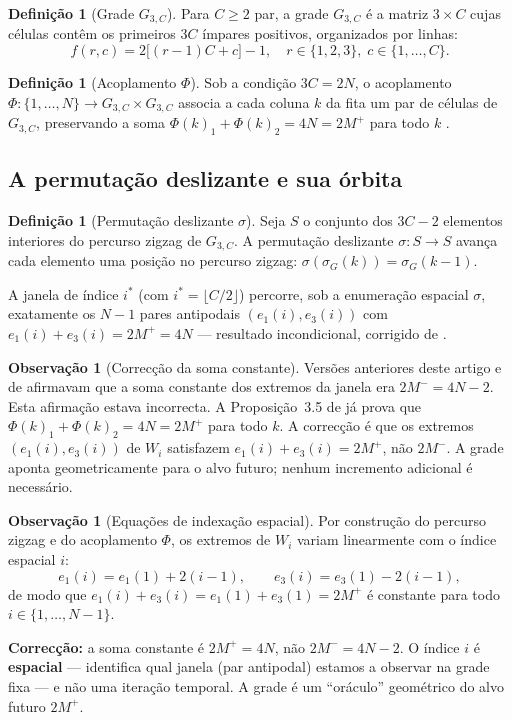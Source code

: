 \documentclass[12pt,a4paper]{article}
\theoremstyle{definition}
\newtheorem{definition}[theorem]{Definição}
\newtheorem{remark}[theorem]{Observação}
\begin{document}
	\begin{definition}[Grade $G_{3,C}$]
		Para $C \geq 2$ par, a grade $G_{3,C}$ é a matriz $3 \times C$ cujas
		células contêm os primeiros $3C$ ímpares positivos, organizados por linhas:
		\[
		f(r,c) = 2\bigl[(r-1)C + c\bigr] - 1,\quad r \in \{1,2,3\},\; c \in \{1,\ldots,C\}.
		\]
	\end{definition}
	
	\begin{definition}[Acoplamento $\Phi$]
		Sob a condição $3C = 2N$, o acoplamento $\Phi: \{1,\ldots,N\} \to
		G_{3,C}\times G_{3,C}$ associa a cada coluna $k$ da fita um par de células
		de $G_{3,C}$, preservando a soma $\Phi(k)_1 + \Phi(k)_2 = 4N = 2M^+$
		para todo $k$ \cite[Prop.~3.5]{motor}.
	\end{definition}
	
	\subsection{A permutação deslizante e sua órbita}
	
	\begin{definition}[Permutação deslizante $\sigma$]
		Seja $S$ o conjunto dos $3C-2$ elementos interiores do percurso zigzag
		de $G_{3,C}$. A permutação deslizante $\sigma: S \to S$ avança cada
		elemento uma posição no percurso zigzag: $\sigma(\sigma_G(k)) =
		\sigma_G(k-1)$.
	\end{definition}
	
	A janela de índice $i^*$ (com $i^* = \lfloor C/2 \rfloor$) percorre,
	sob a enumeração espacial $\sigma$, exatamente os $N-1$ pares antipodais
	$(e_1(i), e_3(i))$ com $e_1(i) + e_3(i) = 2M^+ = 4N$ — resultado
	incondicional, corrigido de \cite[Prop.~4.3, Prop.~4.6]{motor}.
	
	\begin{remark}[Correcção da soma constante]
		\label{rem:correcao-soma}
		Versões anteriores deste artigo e de \cite{motor} afirmavam que a
		soma constante dos extremos da janela era $2M^- = 4N-2$.  Esta
		afirmação estava incorrecta.  A Proposição~3.5 de \cite{motor} já
		prova que $\Phi(k)_1 + \Phi(k)_2 = 4N = 2M^+$ para todo $k$.
		A correcção é que os extremos $(e_1(i), e_3(i))$ de $W_i$
		satisfazem $e_1(i)+e_3(i) = 2M^+$, não $2M^-$.  A grade aponta
		geometricamente para o alvo futuro; nenhum incremento adicional
		é necessário.
	\end{remark}
	
	\begin{remark}[Equações de indexação espacial]
		\label{rem:movimento}
		Por construção do percurso zigzag e do acoplamento $\Phi$, os
		extremos de $W_i$ variam linearmente com o índice espacial $i$:
		\[
		e_1(i) = e_1(1) + 2(i-1),\qquad e_3(i) = e_3(1) - 2(i-1),
		\]
		de modo que $e_1(i) + e_3(i) = e_1(1) + e_3(1) = 2M^+$ é
		constante para todo $i \in \{1,\ldots,N-1\}$.
		
		\textbf{Correcção:} a soma constante é $2M^+ = 4N$,
		não $2M^- = 4N-2$.  O índice $i$ é \textbf{espacial} — identifica
		qual janela (par antipodal) estamos a observar na grade fixa — e
		não uma iteração temporal.  A grade é um ``oráculo'' geométrico do
		alvo futuro $2M^+$.
	\end{remark}
	
\end{document}

